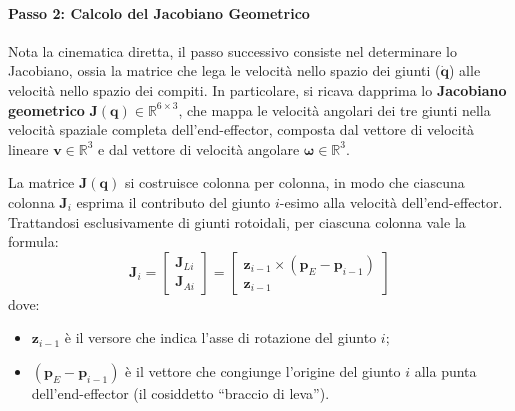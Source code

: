 \documentclass[11pt, a4paper]{report}
\begin{document}
\paragraph{Passo 2: Calcolo del Jacobiano Geometrico}
Nota la cinematica diretta, il passo successivo consiste nel determinare lo Jacobiano, ossia la matrice che lega le velocità nello spazio dei giunti ($\dot{\bm{q}}$) alle velocità nello spazio dei compiti. In particolare, si ricava dapprima lo \textbf{Jacobiano geometrico} $\bm{J}(\bm{q}) \in \mathbb{R}^{6 \times 3}$, che mappa le velocità angolari dei tre giunti nella velocità spaziale completa dell'end-effector, composta dal vettore di velocità lineare $\bm{v} \in \mathbb{R}^3$ e dal vettore di velocità angolare $\bm{\omega} \in \mathbb{R}^3$.

La matrice $\bm{J}(\bm{q})$ si costruisce colonna per colonna, in modo che ciascuna colonna $\bm{J}_i$ esprima il contributo del giunto $i$-esimo alla velocità dell'end-effector. Trattandosi esclusivamente di giunti rotoidali, per ciascuna colonna vale la formula:
\[
\bm{J}_i =
\begin{bmatrix} \bm{J}_{Li} \\ \bm{J}_{Ai} \end{bmatrix} =
\begin{bmatrix} \bm{z}_{i-1} \times (\bm{p}_E - \bm{p}_{i-1}) \\ \bm{z}_{i-1} \end{bmatrix}
\]
dove:
\begin{itemize}
    \item $\bm{z}_{i-1}$ è il versore che indica l'asse di rotazione del giunto $i$;
    \item $(\bm{p}_E - \bm{p}_{i-1})$ è il vettore che congiunge l'origine del giunto $i$ alla punta dell'end-effector (il cosiddetto ``braccio di leva'').
\end{itemize}
\end{document}
